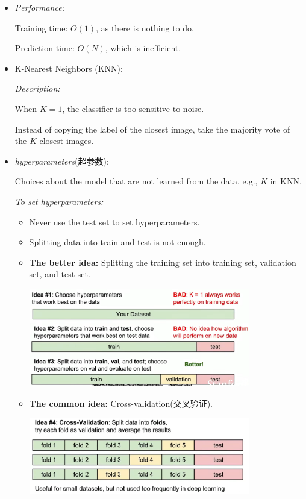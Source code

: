 \documentclass{article}
\numberwithin{equation}{section}
\begin{document}
\begin{CJK}{UTF8}{gbsn}
\begin{enumerate}
\begin{enumerate}
\begin{itemize}
            \item \textit{Performance:}\par
            Training time: \(O(1)\), as there is nothing to do.\par
            Prediction time: \(O(N)\), which is inefficient.
        
            \item K-Nearest Neighbors (KNN):\par
            \textit{Description:} \par
            When \(K = 1\), the classifier is too sensitive to noise.\par
            Instead of copying the label of the closest image, take the majority vote of the \(K\) closest images.
            \item \textit{hyperparameters}(超参数):\par
            Choices about the model that are not learned from the data, e.g., \(K\) in KNN.\par
            \textit{To set hyperparameters:}\par
            \begin{itemize}
                \item Never use the test set to set hyperparameters.\par
                \item Splitting data into train and test is not enough.\par
                \item \textbf{The better idea:} Splitting the training set into training set, validation set, and test set.\par
                \includegraphics[width=0.8\textwidth]{images/Lecture2/ideas_for_hyperparameter.png}
                \item \textbf{The common idea:} Cross-validation(交叉验证).\par
                \includegraphics[width=0.8\textwidth]{images/Lecture2/cross_validation.png}
            \end{itemize}


\end{itemize}
\end{enumerate}
\end{enumerate}
\end{CJK}
\end{document}
